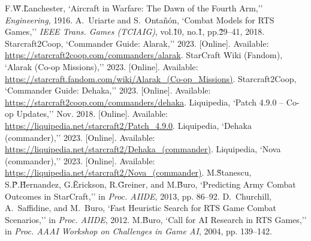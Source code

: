 \documentclass[a4paper,12pt]{article}
\begin{document}
\begin{CJK}{UTF8}{gbsn}
\begin{thebibliography}{99}\small
{} F.\~W.\~Lanchester, `Aircraft in Warfare: The Dawn of the Fourth Arm,'' \emph{Engineering}, 1916.
 A.~Uriarte and S.~Ontañón, `Combat Models for RTS Games,'' \emph{IEEE Trans. Games (TCIAIG)}, vol.\~10, no.\~1, pp.\~29–41, 2018.
 Starcraft2Coop, `Commander Guide: Alarak,'' 2023. [Online]. Available: \url{https://starcraft2coop.com/commanders/alarak}.
 StarCraft Wiki (Fandom), `Alarak (Co-op Missions),'' 2023. [Online]. Available: \url{https://starcraft.fandom.com/wiki/Alarak_(Co-op_Missions)}.
 Starcraft2Coop, `Commander Guide: Dehaka,'' 2023. [Online]. Available: \url{https://starcraft2coop.com/commanders/dehaka}.
 Liquipedia, `Patch 4.9.0 – Co-op Updates,'' Nov. 2018. [Online]. Available: \url{https://liquipedia.net/starcraft2/Patch_4.9.0}.
 Liquipedia, `Dehaka (commander),'' 2023. [Online]. Available: \url{https://liquipedia.net/starcraft2/Dehaka_(commander)}.
 Liquipedia, `Nova (commander),'' 2023. [Online]. Available: \url{https://liquipedia.net/starcraft2/Nova_(commander)}.
 M.\~Stanescu, S.\~P.\~Hernandez, G.\~Erickson, R.\~Greiner, and M.\~Buro, `Predicting Army Combat Outcomes in StarCraft,'' in \emph{Proc. AIIDE}, 2013, pp. 86–92.
 D.~Churchill, A.~Saffidine, and M.~Buro, `Fast Heuristic Search for RTS Game Combat Scenarios,'' in \emph{Proc. AIIDE}, 2012.
 M.\~Buro, `Call for AI Research in RTS Games,'' in \emph{Proc. AAAI Workshop on Challenges in Game AI}, 2004, pp. 139–142.
\end{thebibliography}

\end{CJK}
\end{document}

